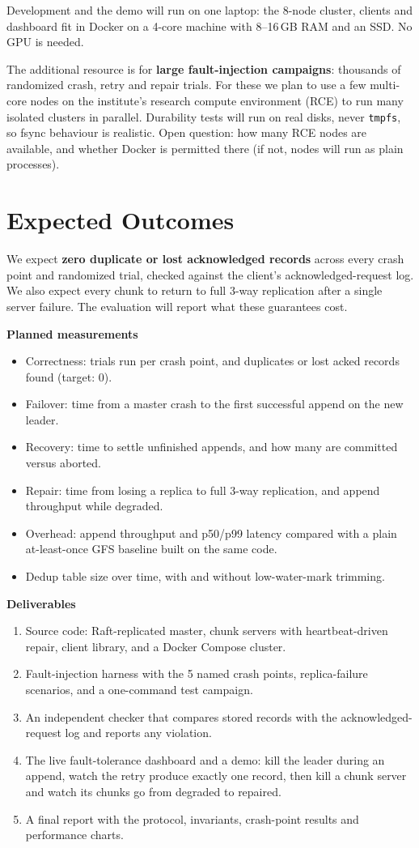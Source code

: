 \documentclass[10pt,a4paper]{article}
\begin{document}
Development and the demo will run on one laptop: the 8-node cluster, clients and dashboard fit in Docker
on a 4-core machine with 8--16\,GB RAM and an SSD. No GPU is needed.

The additional resource is for \textbf{large fault-injection campaigns}: thousands of randomized
crash, retry and repair trials. For these we plan to use a few multi-core nodes on the institute's
research compute environment (RCE) to run many isolated clusters in parallel. Durability tests will run
on real disks, never \texttt{tmpfs}, so fsync behaviour is realistic. Open question: how many RCE nodes are
available, and whether Docker is permitted there (if not, nodes will run as plain processes).

\section{Expected Outcomes}

We expect \textbf{zero duplicate or lost acknowledged records} across every crash point and randomized
trial, checked against the client's acknowledged-request log. We also expect every chunk to return to full
3-way replication after a single server failure. The evaluation will report what these guarantees cost.

\textbf{Planned measurements}
\begin{itemize}
  \item Correctness: trials run per crash point, and duplicates or lost acked records found (target: 0).
  \item Failover: time from a master crash to the first successful append on the new leader.
  \item Recovery: time to settle unfinished appends, and how many are committed versus aborted.
  \item Repair: time from losing a replica to full 3-way replication, and append throughput while degraded.
  \item Overhead: append throughput and p50/p99 latency compared with a plain at-least-once GFS baseline built on the same code.
  \item Dedup table size over time, with and without low-water-mark trimming.
\end{itemize}

\textbf{Deliverables}
\begin{enumerate}
  \item Source code: Raft-replicated master, chunk servers with heartbeat-driven repair, client library, and a Docker Compose cluster.
  \item Fault-injection harness with the 5 named crash points, replica-failure scenarios, and a one-command test campaign.
  \item An independent checker that compares stored records with the acknowledged-request log and reports any violation.
  \item The live fault-tolerance dashboard and a demo: kill the leader during an append, watch the retry produce exactly one record, then kill a chunk server and watch its chunks go from degraded to repaired.
  \item A final report with the protocol, invariants, crash-point results and performance charts.
\end{enumerate}
\end{document}
